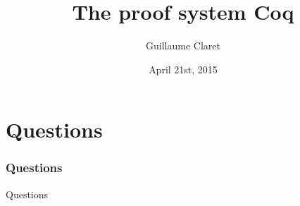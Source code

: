 \documentclass[hyperref={pdfpagelabels=false}]{beamer}
\begin{document}
\title{The proof system Coq}
\author{Guillaume Claret}
\date{April 21st, 2015}
\maketitle





\section*{Questions}
\begin{frame}
  \frametitle{Questions}
  \Huge{Questions}
\end{frame}
\end{document}
